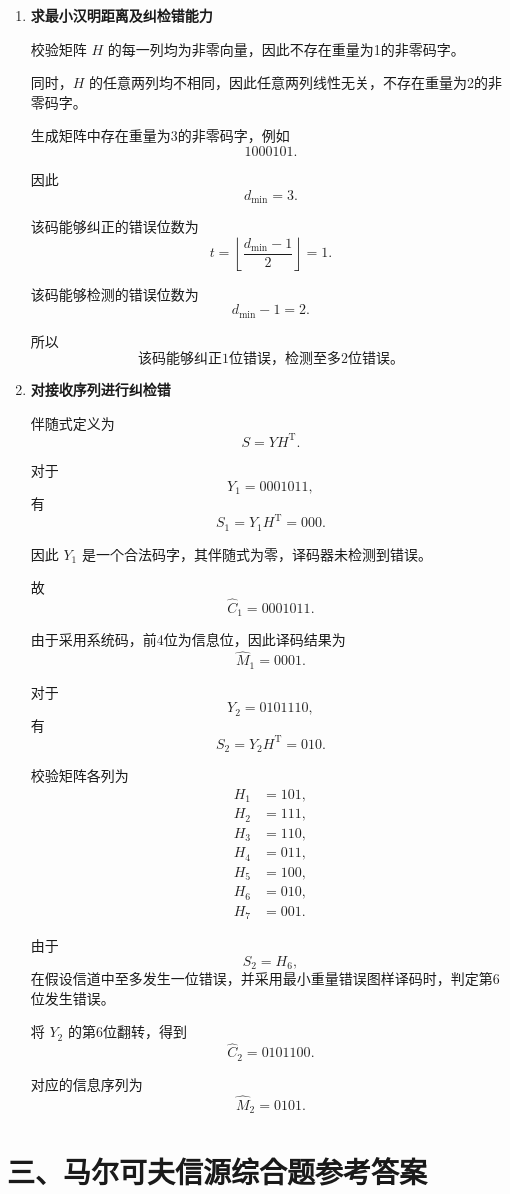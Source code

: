\documentclass[UTF8,a4paper,12pt]{ctexart}
\begin{document}
\begin{enumerate}[label=\arabic*., leftmargin=2.2em]
可以验证
\[
GH^{\mathrm T}=0.
\]


\item \textbf{求最小汉明距离及纠检错能力}

校验矩阵 $H$ 的每一列均为非零向量，因此不存在重量为1的非零码字。

同时，$H$ 的任意两列均不相同，因此任意两列线性无关，不存在重量为2的非零码字。

生成矩阵中存在重量为3的非零码字，例如
\[
1000101.
\]

因此
\[
\boxed{d_{\min}=3}.
\]

该码能够纠正的错误位数为
\[
t
=
\left\lfloor
\frac{d_{\min}-1}{2}
\right\rfloor
=
1.
\]

该码能够检测的错误位数为
\[
d_{\min}-1=2.
\]

所以
\[
\boxed{\text{该码能够纠正1位错误，检测至多2位错误。}}
\]


\item \textbf{对接收序列进行纠检错}

伴随式定义为
\[
S=YH^{\mathrm T}.
\]

对于
\[
Y_1=0001011,
\]
有
\[
S_1
=
Y_1H^{\mathrm T}
=
000.
\]

因此 $Y_1$ 是一个合法码字，其伴随式为零，译码器未检测到错误。

故
\[
\boxed{\widehat C_1=0001011}.
\]

由于采用系统码，前4位为信息位，因此译码结果为
\[
\boxed{\widehat M_1=0001}.
\]

对于
\[
Y_2=0101110,
\]
有
\[
S_2
=
Y_2H^{\mathrm T}
=
010.
\]

校验矩阵各列为
\[
\begin{aligned}
H_1&=101,\\
H_2&=111,\\
H_3&=110,\\
H_4&=011,\\
H_5&=100,\\
H_6&=010,\\
H_7&=001.
\end{aligned}
\]

由于
\[
S_2=H_6,
\]
在假设信道中至多发生一位错误，并采用最小重量错误图样译码时，判定第6位发生错误。

将 $Y_2$ 的第6位翻转，得到
\[
\boxed{\widehat C_2=0101100}.
\]

对应的信息序列为
\[
\boxed{\widehat M_2=0101}.
\]

\end{enumerate}


\newpage

\section*{三、马尔可夫信源综合题参考答案}
\end{document}
